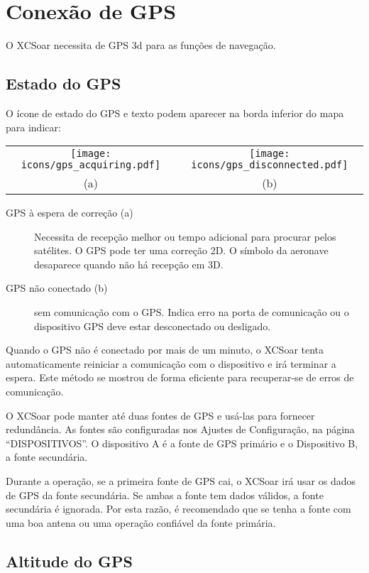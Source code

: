 \section{Conexão de GPS}

O XCSoar necessita de GPS 3d para as funções de navegação.

\subsection*{Estado do GPS}

O ícone de estado do GPS e texto podem aparecer na borda inferior do mapa para indicar:

\begin{tabular}{c c}%
\texttt{[image: icons/gps\_acquiring.pdf]} & \texttt{[image: icons/gps\_disconnected.pdf]}\\
(a) & (b)
\end{tabular}

\begin{description}
\item[GPS à espera de correção (a)] Necessita de recepção melhor ou tempo adicional para procurar pelos satélites.  O GPS pode ter uma correção 2D.  O símbolo da aeronave desaparece quando não há recepção em 3D.
\item[GPS  não conectado  (b)]  sem comunicação com o GPS.  Indica erro na porta de comunicação ou o dispositivo GPS deve estar desconectado ou desligado.
\end{description}

Quando o GPS não é conectado por mais de um minuto, o XCSoar tenta automaticamente reiniciar a comunicação com o dispositivo e irá terminar a espera.  Este método se mostrou de forma eficiente para recuperar-se de erros de comunicação.

O XCSoar pode manter até duas fontes de GPS e usá-las para fornecer redundância.  As fontes são configuradas nos Ajustes de Configuração, na página “DISPOSITIVOS”.  O dispositivo A é a fonte de GPS primário e o Dispositivo B, a fonte secundária.

Durante a operação, se a primeira fonte de GPS cai, o XCSoar irá usar os dados de GPS da fonte secundária.  Se ambas a fonte tem dados válidos, a fonte secundária é ignorada.  Por esta razão, é recomendado que se tenha a fonte com uma boa antena ou uma operação confiável da fonte primária.

\subsection*{Altitude do GPS}


